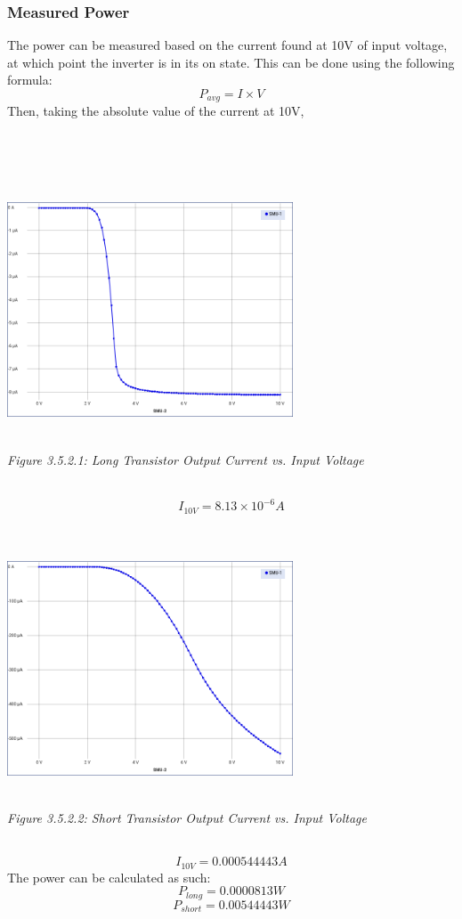 \documentclass[12pt]{article}
\begin{document}
\subsubsection{Measured Power}
The power can be measured based on the current found at 10V of input voltage, at which point the inverter is in its on state. This can be done using the following formula:
\[P_{avg} = I \times V \]
Then, taking the absolute value of the current at 10V,
\\
\\
\\
\\
\\\centerline{\includegraphics[width=8.5cm] {Long Transistor Current.PNG}}
\begin{center}
\\\emph{Figure 3.5.2.1: Long Transistor Output Current vs. Input Voltage}
\end{center}
\\
\[I_{10V} = 8.13 \times 10^{-6}A\]
\\
\\\centerline{\includegraphics[width=8.5cm] {Short Transistor Current.PNG}}
\begin{center}
\\\emph{Figure 3.5.2.2: Short Transistor Output Current vs. Input Voltage}
\end{center}
\\
\[I_{10V} = 0.000544443A\]
The power can be calculated as such:
\[P_{long} = 0.0000813W\]
\[P_{short} = 0.00544443W\]
\end{document}

